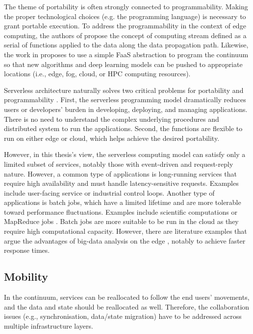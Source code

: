 The theme of portability is often strongly connected to programmability. Making the proper technological choices (e.g. the programming language) is necessary to grant portable execution. To address the programmability in the context of edge computing, the authors of \cite{edge-computing-vision-challenges} propose the concept of computing stream defined as a serial of functions applied to the data along the data propagation path. Likewise, the work in \cite{harnessing-continuum} proposes to use a simple FaaS abstraction to program the continuum so that new algorithms and deep learning models can be pushed to appropriate locations (i.e., edge, fog, cloud, or HPC computing resources).

Serverless architecture naturally solves two critical problems for portability and programmability \cite{lavea}. First, the serverless programming model dramatically reduces users or developers' burden in developing, deploying, and managing applications. There is no need to understand the complex underlying procedures and distributed system to run the applications. Second, the functions are flexible to run on either edge or cloud, which helps achieve the desired portability.

However, in this thesis's view, the serverless computing model can satisfy only a limited subset of services, notably those with event-driven and request-reply nature. However, a common type of applications is long-running services that require high availability and must handle latency-sensitive requests. Examples include user-facing service or industrial control loops. Another type of applications is batch jobs, which have a limited lifetime and are more tolerable toward performance fluctuations. Examples include scientific computations or MapReduce jobs \cite{map-reduce}. Batch jobs are more suitable to be run in the cloud as they require high computational capacity. However, there are literature examples that argue the advantages of big-data analysis on the edge \cite{data-analytics-iot}, notably to achieve faster response times.

\subsection{Mobility}

In the continuum, services can be reallocated to follow the end users' movements, and the data and state should be reallocated as well. Therefore, the collaboration issues (e.g., synchronisation, data/state migration) have to be addressed across multiple infrastructure layers.

